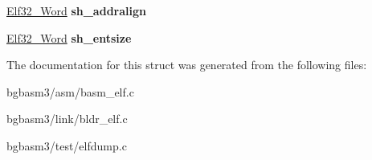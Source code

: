 \begin{DoxyCompactItemize}
\item 
\hypertarget{structElf32__Shdr_a399f50b3591e6286d4ad819f790979ed}{\hyperlink{structElf32__Sword}{Elf32\-\_\-\-Word} {\bfseries sh\-\_\-addralign}}\label{structElf32__Shdr_a399f50b3591e6286d4ad819f790979ed}

\item 
\hypertarget{structElf32__Shdr_a10c59cecc928aae27930601fe545d3ca}{\hyperlink{structElf32__Sword}{Elf32\-\_\-\-Word} {\bfseries sh\-\_\-entsize}}\label{structElf32__Shdr_a10c59cecc928aae27930601fe545d3ca}

\end{DoxyCompactItemize}


The documentation for this struct was generated from the following files\-:\begin{DoxyCompactItemize}
\item 
bgbasm3/asm/basm\-\_\-elf.\-c\item 
bgbasm3/link/bldr\-\_\-elf.\-c\item 
bgbasm3/test/elfdump.\-c\end{DoxyCompactItemize}
